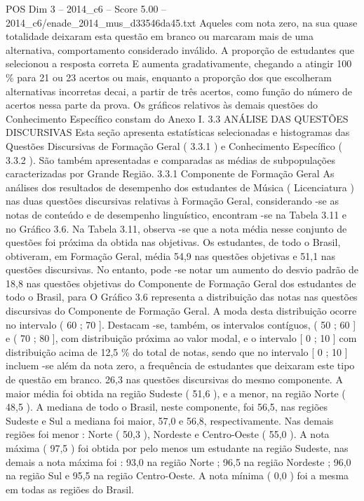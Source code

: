 \begin{textsample}{POS Dim 3 – 2014\_c6 – Score 5.00 – 2014\_c6/enade\_2014\_mus\_d33546da45.txt}
Aqueles com nota zero, na sua quase totalidade deixaram esta questão em branco ou marcaram mais de uma alternativa, comportamento considerado inválido.
A proporção de estudantes que selecionou a resposta correta E aumenta gradativamente, chegando a atingir 100 \% para 21 ou 23 acertos ou mais, enquanto a proporção dos que escolheram alternativas incorretas decai, a partir de três acertos, como função do número de acertos nessa parte da prova.
Os gráficos relativos às demais questões do Conhecimento Específico constam do Anexo I. 3.3 ANÁLISE DAS QUESTÕES DISCURSIVAS Esta seção apresenta estatísticas selecionadas e histogramas das Questões Discursivas de Formação Geral ( 3.3.1 ) e Conhecimento Específico ( 3.3.2 ).
São também apresentadas e comparadas as médias de subpopulações caracterizadas por Grande Região. 3.3.1 Componente de Formação Geral As análises dos resultados de desempenho dos estudantes de Música ( Licenciatura ) nas duas questões discursivas relativas à Formação Geral, considerando -se as notas de conteúdo e de desempenho linguístico, encontram -se na Tabela 3.11 e no Gráfico 3.6.
Na Tabela 3.11, observa -se que a nota média nesse conjunto de questões foi próxima da obtida nas objetivas.
Os estudantes, de todo o Brasil, obtiveram, em Formação Geral, média 54,9 nas questões objetivas e 51,1 nas questões discursivas.
No entanto, pode -se notar um aumento do desvio padrão de 18,8 nas questões objetivas do Componente de Formação Geral dos estudantes de todo o Brasil, para O Gráfico 3.6 representa a distribuição das notas nas questões discursivas do Componente de Formação Geral.
A moda desta distribuição ocorre no intervalo ( 60 ; 70 ].
Destacam -se, também, os intervalos contíguos, ( 50 ; 60 ] e ( 70 ; 80 ], com distribuição próxima ao valor modal, e o intervalo [ 0 ; 10 ] com distribuição acima de 12,5 \% do total de notas, sendo que no intervalo [ 0 ; 10 ] incluem -se além da nota zero, a frequência de estudantes que deixaram este tipo de questão em branco. 26,3 nas questões discursivas do mesmo componente.
A maior média foi obtida na região Sudeste ( 51,6 ), e a menor, na região Norte ( 48,5 ).
A mediana de todo o Brasil, neste componente, foi 56,5, nas regiões Sudeste e Sul a mediana foi maior, 57,0 e 56,8, respectivamente.
Nas demais regiões foi menor : Norte ( 50,3 ), Nordeste e Centro-Oeste ( 55,0 ).
A nota máxima ( 97,5 ) foi obtida por pelo menos um estudante na região Sudeste, nas demais a nota máxima foi : 93,0 na região Norte ; 96,5 na região Nordeste ; 96,0 na região Sul e 95,5 na região Centro-Oeste.
A nota mínima ( 0,0 ) foi a mesma em todas as regiões do Brasil.

\end{textsample}
